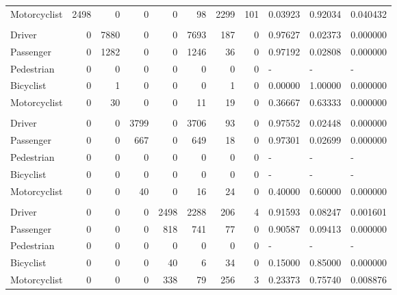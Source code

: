 \documentclass[]{elsarticle} %
\begin{document}
\begin{table}[!h]
{\begin{tabular}[t]{lrrrrrrrlll}
\hspace{1em}Motorcyclist & 2498 & 0 & 0 & 0 & 98 & 2299 & 101 & 0.03923 & 0.92034 & 0.040432\\
\rowcolor{gray!6}  \addlinespace[0.3em]
\multicolumn{11}{l}{\textbf{Opponent: Pedestrian}}\\
\hspace{1em}Driver & 0 & 7880 & 0 & 0 & 7693 & 187 & 0 & 0.97627 & 0.02373 & 0.000000\\
\hspace{1em}Passenger & 0 & 1282 & 0 & 0 & 1246 & 36 & 0 & 0.97192 & 0.02808 & 0.000000\\
\rowcolor{gray!6}  \hspace{1em}Pedestrian & 0 & 0 & 0 & 0 & 0 & 0 & 0 & - & - & \vphantom{2} -\\
\hspace{1em}Bicyclist & 0 & 1 & 0 & 0 & 0 & 1 & 0 & 0.00000 & 1.00000 & 0.000000\\
\rowcolor{gray!6}  \hspace{1em}Motorcyclist & 0 & 30 & 0 & 0 & 11 & 19 & 0 & 0.36667 & 0.63333 & 0.000000\\
\addlinespace[0.3em]
\multicolumn{11}{l}{\textbf{Opponent: Bicyclist}}\\
\hspace{1em}Driver & 0 & 0 & 3799 & 0 & 3706 & 93 & 0 & 0.97552 & 0.02448 & 0.000000\\
\rowcolor{gray!6}  \hspace{1em}Passenger & 0 & 0 & 667 & 0 & 649 & 18 & 0 & 0.97301 & 0.02699 & 0.000000\\
\hspace{1em}Pedestrian & 0 & 0 & 0 & 0 & 0 & 0 & 0 & - & - & \vphantom{1} -\\
\rowcolor{gray!6}  \hspace{1em}Bicyclist & 0 & 0 & 0 & 0 & 0 & 0 & 0 & - & - & -\\
\hspace{1em}Motorcyclist & 0 & 0 & 40 & 0 & 16 & 24 & 0 & 0.40000 & 0.60000 & 0.000000\\
\rowcolor{gray!6}  \addlinespace[0.3em]
\multicolumn{11}{l}{\textbf{Opponent: Motorcyclist}}\\
\hspace{1em}Driver & 0 & 0 & 0 & 2498 & 2288 & 206 & 4 & 0.91593 & 0.08247 & 0.001601\\
\hspace{1em}Passenger & 0 & 0 & 0 & 818 & 741 & 77 & 0 & 0.90587 & 0.09413 & 0.000000\\
\rowcolor{gray!6}  Pedestrian & 0 & 0 & 0 & 0 & 0 & 0 & 0 & - & - & \vphantom{2} -\\
\hspace{1em}Bicyclist & 0 & 0 & 0 & 40 & 6 & 34 & 0 & 0.15000 & 0.85000 & 0.000000\\
\rowcolor{gray!6}  \hspace{1em}Motorcyclist & 0 & 0 & 0 & 338 & 79 & 256 & 3 & 0.23373 & 0.75740 & 0.008876\\
\bottomrule
\end{tabular}}
\end{table}
\end{document}
